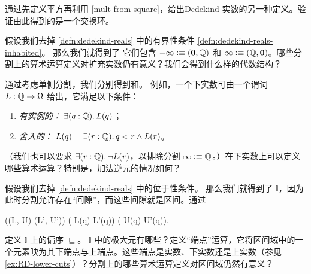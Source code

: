 \sectionExercises

\begin{ex}\label{ex:alt-dedekind-reals}
  通过先定义平方再利用 \cref{mult-from-square}，给出Dedekind 实数的另一种定义。验证由此得到的是一个交换环。
\end{ex}

\begin{ex} \label{ex:RD-extended-reals}
  假设我们去掉 \cref{defn:dedekind-reals} 中的有界性条件 \ref{defn:dedekind-reals-inhabited}。
  那么我们就得到了 
  它们包含 $-\infty \vcentcolon\equiv (\mathbf{0}, \mathbb{Q})$ 和 $\infty \vcentcolon\equiv (\mathbb{Q}, \mathbf{0})$。哪些分割上的算术运算定义对扩充实数仍有意义？我们会得到什么样的代数结构？
\end{ex}

\begin{ex} \label{ex:RD-lower-cuts}
  通过考虑单侧分割，我们分别得到和。
  例如，一个下实数可由一个谓词 $L : \mathbb{Q} \to \Omega$ 给出，它满足以下条件：
  \begin{enumerate}
  \item \emph{有实例的：} $\exis{q : \Q} L(q)$；
  \item \emph{舍入的：} $L(q) = \exis{r : \Q} q < r \land L(r)$。
  \end{enumerate}
  （我们也可以要求 $\exis{r : \Q} \lnot L(r)$，以排除分割 $\infty \vcentcolon\equiv
  \mathbb{Q}$。）在下实数上可以定义哪些算术运算？特别是，加法逆元的情况如何？
\end{ex}

\begin{ex} \label{ex:RD-interval-arithmetic}
  假设我们去掉 \cref{defn:dedekind-reals} 中的位于性条件。
  那么我们就得到了
  $\mathbb{I}$，因为此时分割允许存在``间隙''，而这些间隙就是区间。通过
  \begin{narrowmultline*}
    ((L, U) \sqsubseteq (L', U'))
     \narrowbreak
    ( L(q) \Rightarrow L'(q)) \land
    ( U(q) \Rightarrow U'(q)).
  \end{narrowmultline*}
  定义 $\mathbb{I}$ 上的偏序 $\sqsubseteq$。
  $\mathbb{I}$ 中的极大元有哪些？定义``端点''运算，它将区间域中的一个元素映为其下端点与上端点。这些端点是实数、下实数还是上实数（参见
  \cref{ex:RD-lower-cuts}）？分割上的哪些算术运算定义对区间域仍然有意义？
\end{ex}

